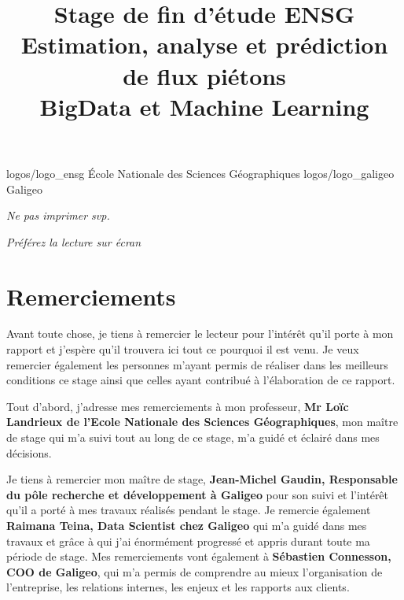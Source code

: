 \documentclass{themeensg}
\title{Stage de fin d'étude ENSG \\ Estimation, analyse et prédiction de flux piétons \\ BigData et Machine Learning}
\renewcommand{\author}{Jules Pierrat}
\begin{document}
\begin{titlepage}
\enterprise 
{logos/logo_ensg}
{\'Ecole Nationale des Sciences Géographiques}
{logos/logo_galigeo}
{Galigeo}





\infos{\author}{Septembre 2022}

\begin{center}
  \textit{Ne pas imprimer svp.}
  
  \textit{Préférez la lecture sur écran}
\end{center}

\end{titlepage}



\newevenpage
\chapter*{Remerciements}

Avant toute chose, je tiens à remercier le lecteur pour l’intérêt qu’il porte à mon rapport et j’espère qu’il trouvera ici tout ce pourquoi il est venu. Je veux remercier également les personnes m’ayant permis de réaliser dans les meilleurs conditions ce stage ainsi que celles ayant contribué à l’élaboration de ce rapport.

Tout d'abord, j'adresse mes remerciements à mon professeur, \textbf{Mr Loïc Landrieux de l’Ecole Nationale des Sciences Géographiques}, mon maître de stage qui m’a suivi tout au long de ce stage, m’a guidé et éclairé dans mes décisions.

Je tiens à remercier mon maître de stage, \textbf{Jean-Michel Gaudin, Responsable du pôle recherche et développement à Galigeo} pour son suivi et l’intérêt qu’il a porté à mes travaux réalisés pendant le stage. Je remercie également \textbf{Raimana Teina, Data Scientist chez Galigeo} qui m’a guidé dans mes travaux et grâce à qui j’ai énormément progressé et appris durant toute ma période de stage. Mes remerciements vont également à \textbf{Sébastien Connesson, COO de Galigeo}, qui m’a permis de comprendre au mieux l’organisation de l’entreprise, les relations internes, les enjeux et les rapports aux clients.
\end{document}
